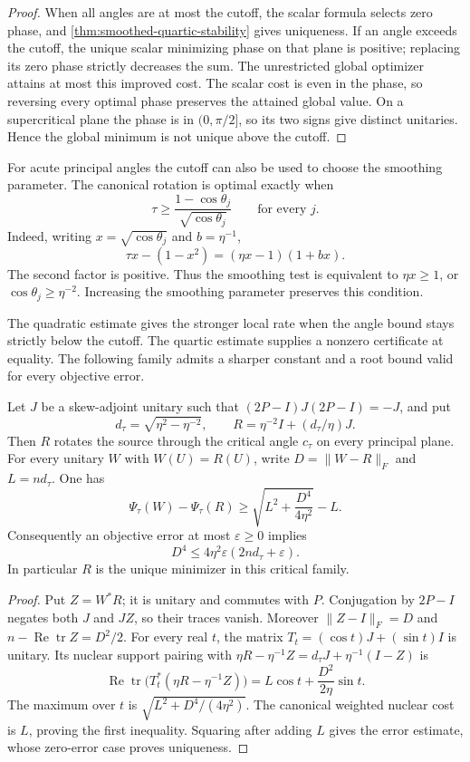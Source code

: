 \begin{proof}
When all angles are at most the cutoff, the scalar formula selects zero
phase, and \cref{thm:smoothed-quartic-stability} gives uniqueness.
If an angle exceeds the cutoff, the unique scalar minimizing phase on
that plane is positive; replacing its zero phase strictly decreases the
sum. The unrestricted global optimizer attains at most this improved cost.
The scalar cost is even in the phase, so reversing every optimal phase
preserves the attained global value. On a supercritical plane the phase is
in $(0,\pi/2]$, so its two signs give distinct
unitaries. Hence the global minimum is not unique above the cutoff.
\end{proof}

For acute principal angles the cutoff can also be used to choose the
smoothing parameter. The canonical rotation is optimal exactly when
\[
 \tau\geq\frac{1-\cos\theta_j}{\sqrt{\cos\theta_j}}
 \qquad\text{for every }j.
\]
Indeed, writing $x=\sqrt{\cos\theta_j}$ and $b=\eta^{-1}$,
\[
 \tau x-(1-x^2)=(\eta x-1)(1+bx).
\]
The second factor is positive. Thus the smoothing test is equivalent to
$\eta x\geq1$, or $\cos\theta_j\geq\eta^{-2}$.
Increasing the smoothing parameter preserves this condition.

The quadratic estimate gives the stronger local rate when the angle bound
stays strictly below the cutoff. The quartic estimate supplies a nonzero
certificate at equality. The following family admits a sharper constant
and a root bound valid for every objective error.

\begin{proposition}
\label{prop:smoothed-critical-stability}
Let $J$ be a skew-adjoint unitary such that
$(2P-I)J(2P-I)=-J$, and put
\[
 d_\tau=\sqrt{\eta^2-\eta^{-2}},\qquad
 R=\eta^{-2}I+(d_\tau/\eta)J.
\]
Then $R$ rotates the source through the critical angle $c_\tau$ on
every principal plane. For every unitary $W$ with $W(U)=R(U)$,
write $D=\|W-R\|_F$ and $L=nd_\tau$. One has
\[
 \Psi_\tau(W)-\Psi_\tau(R)
 \geq \sqrt{L^2+\frac{D^4}{4\eta^2}}-L.
\]
Consequently an objective error at most $\varepsilon\geq0$ implies
\[
 D^4\leq 4\eta^2\varepsilon(2nd_\tau+\varepsilon).
\]
In particular $R$ is the unique minimizer in this critical family.
\end{proposition}

\begin{proof}
Put $Z=W^*R$; it is unitary and commutes with $P$. Conjugation by
$2P-I$ negates both $J$ and $JZ$, so their traces vanish.
Moreover $\|Z-I\|_F=D$ and
$n-\operatorname{Re}\operatorname{tr}Z=D^2/2$.
For every real $t$, the matrix
$T_t=(\cos t)J+(\sin t)I$ is unitary. Its nuclear support pairing with
$\eta R-\eta^{-1}Z=d_\tau J+\eta^{-1}(I-Z)$ is
\[
 \operatorname{Re}\operatorname{tr}
   \bigl(T_t^*(\eta R-\eta^{-1}Z)\bigr)
 =L\cos t+\frac{D^2}{2\eta}\sin t.
\]
The maximum over $t$ is
$\sqrt{L^2+D^4/(4\eta^2)}$. The canonical weighted nuclear cost is
$L$, proving the first inequality. Squaring after adding $L$ gives the
error estimate, whose zero-error case proves uniqueness.
\end{proof}

